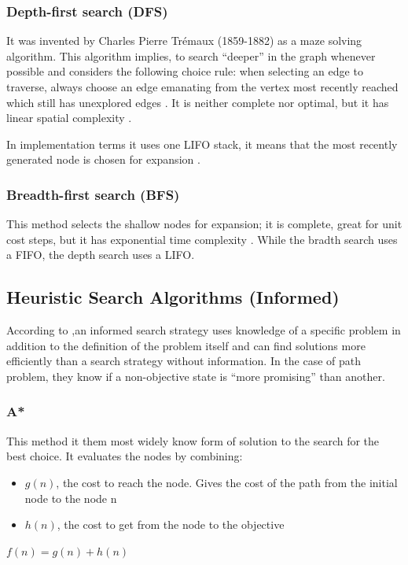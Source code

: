 \documentclass[12pt]{article}
\begin{document}
\subsubsection{Depth-first search (DFS)}
It was invented by Charles Pierre Trémaux (1859-1882) \cite{tremaux2010ecole} as a maze solving algorithm.
This algorithm implies, to search “deeper” in the graph whenever possible \cite{cormen2009introduction} and
considers the following choice rule: when selecting an
edge to traverse, always choose an edge emanating from the vertex most recently reached which still has unexplored edges \cite{tarjan1972depth}.
It is neither complete nor optimal, but it has linear spatial complexity \cite{russell2004inteligencia}.

In implementation terms it uses one LIFO stack, it means that the most recently generated node is chosen for expansion \cite{russell2004inteligencia}.


\subsubsection{Breadth-first search (BFS)}
This method selects the shallow nodes for expansion; it is complete, great for unit cost steps, but it has exponential time complexity \cite{russell2004inteligencia}.
While the bradth search uses a FIFO, the depth search uses a LIFO. 


\subsection{Heuristic Search Algorithms (Informed)}
According to \cite{russell2004inteligencia},an informed search strategy uses knowledge of a specific problem in addition to the definition of the problem itself and can find solutions more efficiently than a search strategy without information. In the case of path problem, they know if a non-objective state is “more promising” than another.

\subsubsection{A*}
This method it them most widely know form of solution to the search for the best choice.
It evaluates the nodes by combining:
\begin{itemize}
    \item $g(n)$, the cost to reach the node. Gives the cost of the path from the initial node to the node n
    \item $h(n)$, the cost to get from the node to the objective
\end{itemize}
\begin{center}
    $f(n) = g(n) + h(n)$
\end{center}
\end{document}
